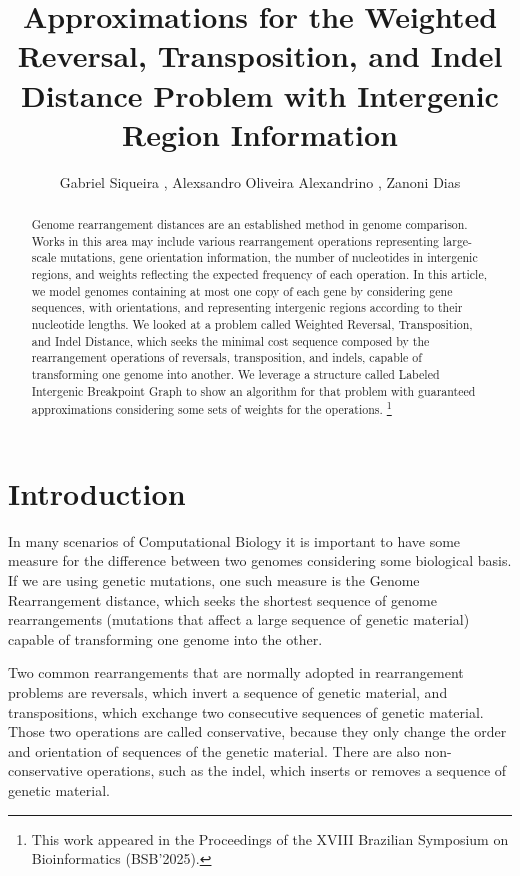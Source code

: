 \documentclass[12pt]{article}
\title{Approximations for the Weighted Reversal, Transposition, and Indel Distance Problem with Intergenic Region Information}
\author{Gabriel Siqueira\inst{1}%
, Alexsandro Oliveira Alexandrino\inst{1}%
, Zanoni Dias\inst{1}%
}
\newcommand\blfootnote[1]{%
  \begingroup
  \renewcommand\thefootnote{}\footnote{#1}%
  \addtocounter{footnote}{-1}%
  \endgroup
}
\begin{document}
 

\maketitle

\begin{abstract}
Genome rearrangement distances are an established method in genome comparison. Works in this area may include various rearrangement operations representing large-scale mutations, gene orientation information, the number of nucleotides in intergenic regions, and weights reflecting the expected frequency of each operation. In this article, we model genomes containing at most one copy of each gene by considering gene sequences, with orientations, and representing intergenic regions according to their nucleotide lengths. We looked at a problem called Weighted Reversal, Transposition, and Indel Distance, which seeks the minimal cost sequence composed by the rearrangement operations of reversals, transposition, and indels, capable of transforming one genome into another. We leverage a structure called Labeled Intergenic Breakpoint Graph to show an algorithm for that problem with guaranteed approximations considering some sets of weights for the operations. \blfootnote{This work appeared in the Proceedings of the XVIII Brazilian Symposium on Bioinformatics (BSB'2025).} 
\end{abstract}

\section{Introduction}

In many scenarios of Computational Biology it is important to have some measure for the difference between two genomes considering some biological basis. If we are using genetic mutations, one such measure is the Genome Rearrangement distance, which seeks the shortest sequence of genome rearrangements (mutations that affect a large sequence of genetic material) capable of transforming one genome into the other. 

Two common rearrangements that are normally adopted in rearrangement problems are reversals, which invert a sequence of genetic material, and transpositions, which exchange two consecutive sequences of genetic material. Those two operations are called conservative, because they only change the order and orientation of sequences of the genetic material. There are also non-conservative operations, such as the indel, which inserts or removes a sequence of genetic material.
\end{document}
